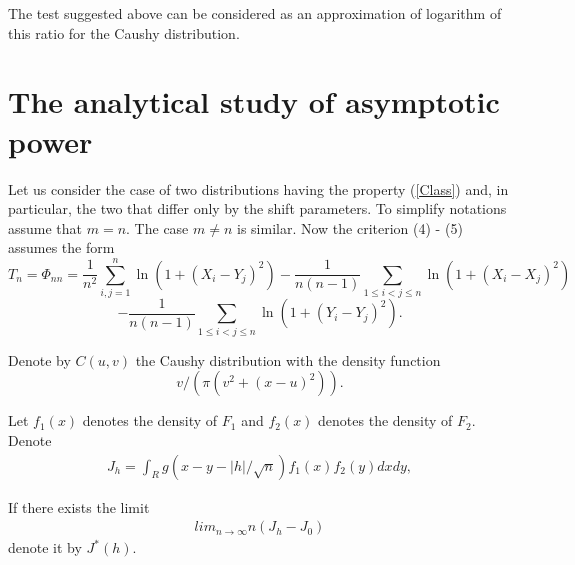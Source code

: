 \documentclass[final,11pt,3p]{elsarticle}
\begin{document}
The test suggested above can be considered as an approximation of logarithm of this ratio for the Caushy distribution.





\section{The analytical study of asymptotic power}
\label{S:2}

Let us consider the case of two distributions having the property (\ref{Class}) and, in particular, the two that differ only by the shift parameters. To simplify notations assume that $m=n$. The case $m\ne n$ is similar.
Now the criterion  (4) - (5)  assumes the form
\begin{equation}
T_n=\Phi_{nn}= \frac{1}{n^2}\sum_{i,j=1}^n \ln(1 + (X_i - Y_j)^2)-\frac{1}{n(n-1)}\sum_{1\leq i<j\leq n}  \ln(1 + (X_i - X_j)^2)
\end{equation}
\begin{equation}
-  \frac{1}{n(n-1)}\sum_{1\leq i<j\leq n}  \ln(1 + (Y_i - Y_j)^2).
\end{equation}

Denote by $C(u,v)$ the Caushy distribution with the density function
$$
v/(\pi(v^2 + (x-u)^2)).
$$

 Let $f_1(x)$ denotes the density of $F_1$ and $f_2(x)$ denotes the density of $F_2$.
Denote
\begin{eqnarray*}
J_h =\int_R g(x-y-|h|/\sqrt{n})f_1(x)f_2(y)dxdy,
\end{eqnarray*}

If there exists the limit
\begin{eqnarray}
lim_{n\to \infty} n(J_h - J_0)
\end{eqnarray}
denote it by $J^*(h)$.
\end{document}
